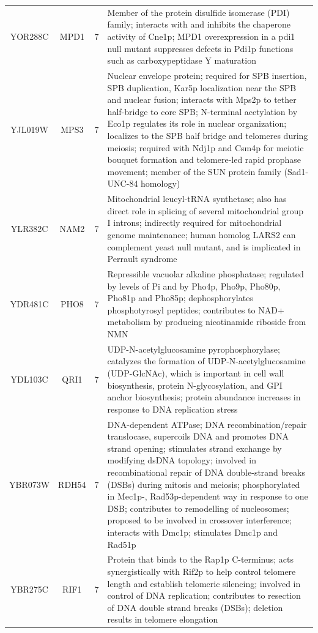\documentclass[]{article}
\begin{document}
\begin{longtable}{@{\extracolsep{3pt}} cccp{85mm}}
YOR288C & MPD1 & 7 & Member of the protein disulfide isomerase (PDI) family; interacts with and inhibits the chaperone activity of Cne1p; MPD1 overexpression in a pdi1 null mutant suppresses defects in Pdi1p functions such as carboxypeptidase Y maturation \\ 
YJL019W & MPS3 & 7 & Nuclear envelope protein; required for SPB insertion, SPB duplication, Kar5p localization near the SPB and nuclear fusion; interacts with Mps2p to tether half-bridge to core SPB; N-terminal acetylation by Eco1p regulates its role in nuclear organization; localizes to the SPB half bridge and telomeres during meiosis; required with Ndj1p and Csm4p for meiotic bouquet formation and telomere-led rapid prophase movement; member of the SUN protein family (Sad1-UNC-84 homology) \\ 
YLR382C & NAM2 & 7 & Mitochondrial leucyl-tRNA synthetase; also has direct role in splicing of several mitochondrial group I introns; indirectly required for mitochondrial genome maintenance; human homolog LARS2 can complement yeast null mutant, and is implicated in Perrault syndrome \\ 
YDR481C & PHO8 & 7 & Repressible vacuolar alkaline phosphatase; regulated by levels of Pi and by Pho4p, Pho9p, Pho80p, Pho81p and Pho85p; dephosphorylates phosphotyrosyl peptides; contributes to NAD+ metabolism by producing nicotinamide riboside from NMN \\ 
YDL103C & QRI1 & 7 & UDP-N-acetylglucosamine pyrophosphorylase; catalyzes the formation of UDP-N-acetylglucosamine (UDP-GlcNAc), which is important in cell wall biosynthesis, protein N-glycosylation, and GPI anchor biosynthesis; protein abundance increases in response to DNA replication stress \\ 
YBR073W & RDH54 & 7 & DNA-dependent ATPase; DNA recombination/repair translocase, supercoils DNA and promotes DNA strand opening; stimulates strand exchange by modifying dsDNA topology; involved in recombinational repair of DNA double-strand breaks (DSBs) during mitosis and meiosis; phosphorylated in Mec1p-, Rad53p-dependent way in response to one DSB; contributes to remodelling of nucleosomes; proposed to be involved in crossover interference; interacts with Dmc1p; stimulates Dmc1p and Rad51p \\ 
YBR275C & RIF1 & 7 & Protein that binds to the Rap1p C-terminus; acts synergistically with Rif2p to help control telomere length and establish telomeric silencing; involved in control of DNA replication; contributes to resection of DNA double strand breaks (DSBs); deletion results in telomere elongation \\ 

\end{longtable}
\end{document}
